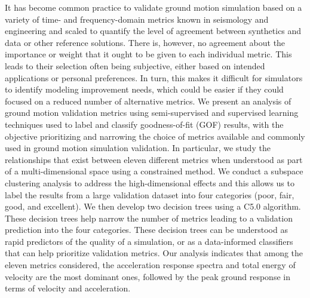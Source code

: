 % 
It has become common practice to validate ground motion simulation based on a variety of time- and frequency-domain metrics known in seismology and engineering and scaled to quantify the level of agreement between synthetics and data or other reference solutions. There is, however, no agreement about the importance or weight that it ought to be given to each individual metric. This leads to their selection often being subjective, either based on intended applications or personal preferences. In turn, this makes it difficult for simulators to identify modeling improvement needs, which could be easier if they could focused on a reduced number of alternative metrics. We present an analysis of ground motion validation metrics using semi-supervised and supervised learning techniques used to label and classify  goodness-of-fit (GOF) results, with the objective prioritizing and narrowing the choice of metrics available and commonly used in ground motion simulation validation. In particular, we study the relationships that exist between eleven different metrics when understood as part of a multi-dimensional space using a constrained \kmeans{} method. We conduct a subspace clustering analysis to address the high-dimensional effects and this allows us to label the results from a large validation dataset into four categories (poor, fair, good, and excellent). We then develop two decision trees using a C5.0 algorithm. These decision trees help narrow the number of metrics leading to a validation prediction into the four categories. These decision trees can be understood as rapid predictors of the quality of a simulation, or as a data-informed classifiers that can help prioritize validation metrics. Our analysis indicates that among the eleven metrics considered, the acceleration response spectra and total energy of velocity are the most dominant ones, followed by the peak ground response in terms of velocity and acceleration.

